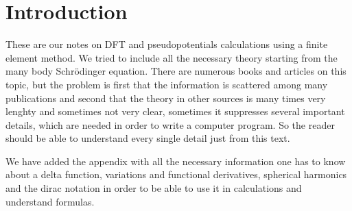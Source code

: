 \chapter{Introduction}

These are our notes on DFT and pseudopotentials calculations using
a finite element method. We tried to include all the necessary theory starting
from the many body Schr\"odinger equation. There are numerous books and
articles on this topic, but the problem is first that the information is
scattered among many publications and second that the theory in other sources
is many times very lenghty and sometimes not very clear, sometimes it
suppresses several important details, which are needed in order to write a
computer program. So the reader should be able to understand every single
detail just from this text. 

We have added the appendix with all the necessary information one has to know
about a delta function, variations and functional derivatives, spherical
harmonics and the dirac notation in order to be able to use it in calculations
and understand formulas.

